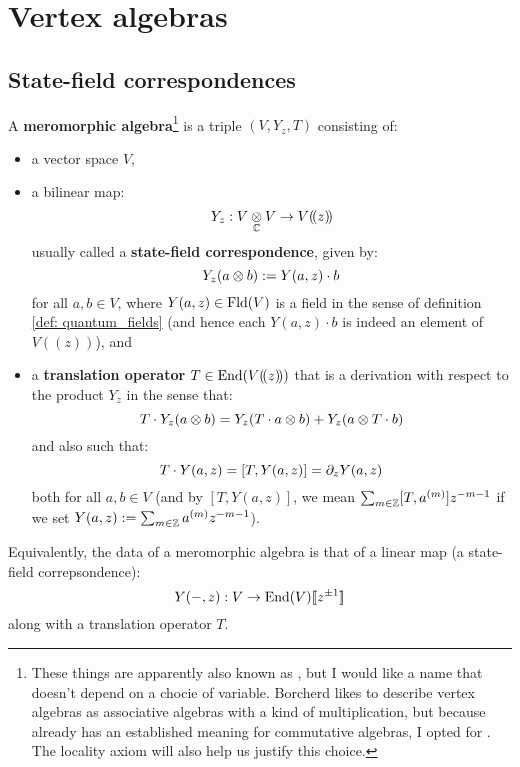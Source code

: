 \section{Vertex algebras}
    \subsection{State-field correspondences}
        \begin{definition} \label{def: meromorphic_algebras}
            A \textbf{meromorphic algebra}\footnote{These things are apparently also known as , but I would like a name that doesn't depend on a chocie of variable. Borcherd likes to describe vertex algebras as associative algebras with a kind of  multiplication, but because  already has an established meaning for commutative algebras, I opted for . The locality axiom will also help us justify this choice.} is a triple $(V, Y_z, T)$ consisting of:
            \begin{itemize}
                \item a vector space $V$,
                \item a bilinear map:
                    $$Y_z: V \tensor_{\bbC} V \to V(\!(z)\!)$$
                usually called a \textbf{state-field correspondence}, given by:
                    $$Y_z(a \tensor b) := Y(a, z) \cdot b$$
                for all $a, b \in V$, where $Y(a, z) \in \mathrm{Fld}(V)$ is a field in the sense of definition \ref{def: quantum_fields} (and hence each $Y(a, z) \cdot b$ is indeed an element of $V(\!(z)\!)$), and
                \item a \textbf{translation operator} $T \in \mathrm{End}( V(\!(z)\!) )$ that is a derivation with respect to the product $Y_z$ in the sense that:
                    $$T \cdot Y_z(a \tensor b) = Y_z( T \cdot a \tensor b ) + Y_z( a \tensor T \cdot b )$$
                and also such that:
                    $$T \cdot Y(a, z) = [T, Y(a, z)] = \partial_z Y(a, z)$$
                both for all $a, b \in V$ (and by $[T, Y(a, z)]$, we mean $\sum_{m \in \mathbb{Z}} [T, a^{(m)}] z^{-m - 1}$ if we set $Y(a, z) := \sum_{m \in \mathbb{Z}} a^{(m)} z^{-m - 1}$).
            \end{itemize}
        \end{definition}
        Equivalently, the data of a meromorphic algebra is that of a linear map (a state-field correpsondence):
            $$Y(-, z): V \to \mathrm{End}(V)[\![z^{\pm 1}]\!]$$
        along with a translation operator $T$.
